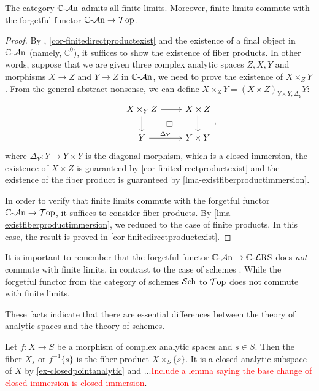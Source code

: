 \begin{corollary}\label{cor-CASCatfinitecom}
    The category $\mathbb{C}\text{-}\mathcal{A}\mathrm{n}$ admits all finite limits. Moreover, finite limits commute with the forgetful functor $\mathbb{C}\text{-}\mathcal{A}\mathrm{n}\rightarrow \mathcal{T}\mathrm{op}$.
\end{corollary}
\begin{proof}
    By \cite[\href{https://stacks.math.columbia.edu/tag/002O}{Tag 002O}]{stacks-project}, \cref{cor-finitedirectproductexist} and the existence of a final object in $\mathbb{C}\text{-}\mathcal{A}\mathrm{n}$ (namely, $\mathbb{C}^0$), it suffices to show the existence of fiber products. In other words, suppose that we are given three complex analytic spaces $Z,X,Y$ and morphisms $X\rightarrow Z$ and $Y\rightarrow Z$ in $\mathbb{C}\text{-}\mathcal{A}\mathrm{n}$, we need to prove the existence of $X\times_Z Y$. From the general abstract nonsense, we can define $X\times_Z Y=(X\times Z)_{Y\times Y,\Delta_Y}Y$:
    \[ 
    \begin{tikzcd}
        & X\times_Y Z \arrow[r]\arrow[d]\arrow[rd,"\square",phantom] & X\times Z \arrow[d]\\
        & Y  \arrow[r,"\Delta_Y"] & Y\times Y
    \end{tikzcd},
    \]
    where $\Delta_Y:Y\rightarrow Y\times Y$ is the diagonal morphism, which is a closed immersion, the existence of $X\times Z$ is guaranteed by \cref{cor-finitedirectproductexist} and the existence of the fiber product is guaranteed by \cref{lma-existfiberproductimmersion}.

    In order to verify that finite limits commute with the forgetful functor $\mathbb{C}\text{-}\mathcal{A}\mathrm{n}\rightarrow \mathcal{T}\mathrm{op}$, it suffices to consider fiber products. By \cref{lma-existfiberproductimmersion}, we reduced to the case of finite products. In this case, the result is proved in \cref{cor-finitedirectproductexist}.
\end{proof}
\begin{remark}
    It is important to remember that the forgetful functor $\mathbb{C}\text{-}\mathcal{A}\mathrm{n}\rightarrow \mathbb{C}\text{-}\mathcal{L}\mathrm{RS}$ does \emph{not} commute with finite limits, in contrast to the case of schemes \cite[\href{https://stacks.math.columbia.edu/tag/01JN}{Tag 01JN}]{stacks-project}. While the forgetful functor from the category of schemes $\mathcal{S}\mathrm{ch}$ to $\mathcal{T}\mathrm{op}$ does not commute with finite limits.
    
    These facts indicate that there are essential differences between the theory of analytic spaces and the theory of schemes.
\end{remark}

\begin{definition}
    Let $f:X\rightarrow S$ be a morphism of complex analytic spaces and $s\in S$. Then the fiber $X_s$ or $f^{-1}\{s\}$ is the fiber product $X\times_{S}\{s\}$. It is a closed analytic subspace of $X$ by \cref{ex-closedpointanalytic} and ...\textcolor{red}{Include a lemma saying the base change of closed immersion is closed immersion}.
\end{definition}

